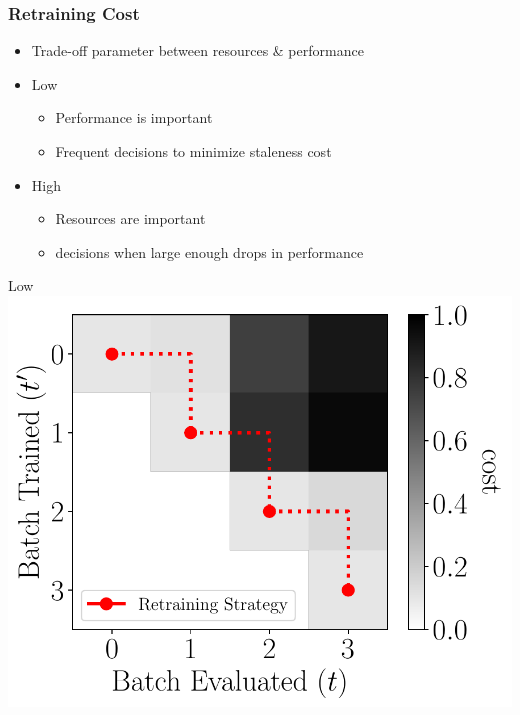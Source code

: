 \documentclass[pdf]{beamer}
\begin{document}
\begin{frame}
    \frametitle{Retraining Cost \retraincost}
    \begin{itemize}
        \item Trade-off parameter between resources \& performance
        \item Low \retraincost
        \begin{itemize}
          \item Performance is important
          \item Frequent \retrain decisions to minimize staleness cost 
        \end{itemize}
        \item High \retraincost
        \begin{itemize}
          \item Resources are important
          \item \retrain decisions when large enough drops in performance
        \end{itemize}
      \end{itemize}
        \begin{minipage}{0.5\textwidth}
          \begin{center}
              {\footnotesize Low \retraincost}\\[1mm]
              \includegraphics[width=\textwidth]{figs/low_retrain_cost.pdf}
          \end{center}
        \end{minipage}%
        \begin{minipage}{0.5\textwidth}

\end{minipage}
\end{frame}
\end{document}
